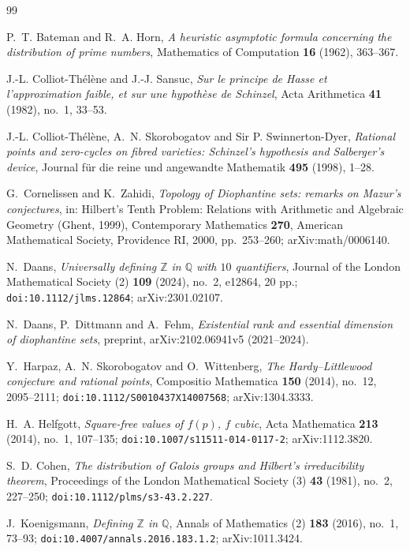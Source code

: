 \documentclass[11pt]{amsart}
\theoremstyle{definition}
\theoremstyle{remark}
\newcommand{\Q}{\mathbb{Q}}
\newcommand{\Z}{\mathbb{Z}}
\begin{document}
\begin{thebibliography}{99}

P.~T. Bateman and R.~A. Horn,
\emph{A heuristic asymptotic formula concerning the distribution of prime
numbers},
Mathematics of Computation \textbf{16} (1962), 363--367.

J.-L. Colliot-Th\'el\`ene and J.-J. Sansuc,
\emph{Sur le principe de Hasse et l'approximation faible, et sur une
hypoth\`ese de Schinzel},
Acta Arithmetica \textbf{41} (1982), no.~1, 33--53.

J.-L. Colliot-Th\'el\`ene, A.~N. Skorobogatov and Sir P. Swinnerton-Dyer,
\emph{Rational points and zero-cycles on fibred varieties: Schinzel's
hypothesis and Salberger's device},
Journal f\"ur die reine und angewandte Mathematik \textbf{495} (1998),
1--28.

G.~Cornelissen and K.~Zahidi,
\emph{Topology of Diophantine sets: remarks on Mazur's conjectures},
in: Hilbert's Tenth Problem: Relations with Arithmetic and Algebraic
Geometry (Ghent, 1999), Contemporary Mathematics \textbf{270},
American Mathematical Society, Providence RI, 2000, pp.~253--260;
arXiv:math/0006140.

N.~Daans,
\emph{Universally defining $\Z$ in $\Q$ with $10$ quantifiers},
Journal of the London Mathematical Society (2) \textbf{109} (2024),
no.~2, e12864, 20 pp.;
\texttt{doi:10.1112/jlms.12864}; arXiv:2301.02107.

N.~Daans, P.~Dittmann and A.~Fehm,
\emph{Existential rank and essential dimension of diophantine sets},
preprint, arXiv:2102.06941v5 (2021--2024).

Y.~Harpaz, A.~N. Skorobogatov and O.~Wittenberg,
\emph{The Hardy--Littlewood conjecture and rational points},
Compositio Mathematica \textbf{150} (2014), no.~12, 2095--2111;
\texttt{doi:10.1112/S0010437X14007568}; arXiv:1304.3333.

H.~A. Helfgott,
\emph{Square-free values of $f(p)$, $f$ cubic},
Acta Mathematica \textbf{213} (2014), no.~1, 107--135;
\texttt{doi:10.1007/s11511-014-0117-2}; arXiv:1112.3820.

S.~D. Cohen,
\emph{The distribution of Galois groups and Hilbert's irreducibility
theorem},
Proceedings of the London Mathematical Society (3) \textbf{43} (1981),
no.~2, 227--250;
\texttt{doi:10.1112/plms/s3-43.2.227}.

J.~Koenigsmann,
\emph{Defining $\Z$ in $\Q$},
Annals of Mathematics (2) \textbf{183} (2016), no.~1, 73--93;
\texttt{doi:10.4007/annals.2016.183.1.2}; arXiv:1011.3424.


\end{thebibliography}
\end{document}
